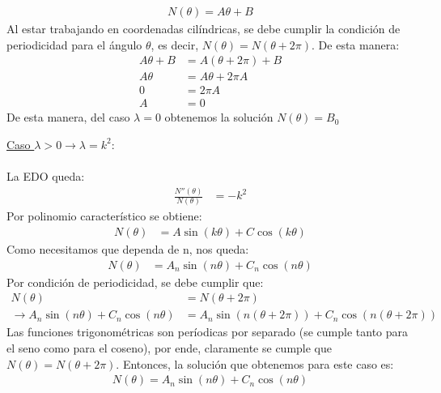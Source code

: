 \documentclass[
  11pt,
  letterpaper,
   answers
  ]{exam}
\begin{document}
\begin{questions}
\begin{solution}
\begin{parts}
    \begin{align}
        N(\theta) = A \theta + B
    \end{align}
    Al estar trabajando en coordenadas cilíndricas, se debe cumplir la condición de periodicidad para el ángulo $\theta$, es decir, $N(\theta) = N(\theta + 2 \pi)$. De esta manera:
    \begin{align}
        A \theta + B &= A(\theta + 2 \pi) + B \\
        A \theta &= A \theta + 2 \pi A \\
        0 &= 2 \pi A \\
        A &= 0
    \end{align}
    De esta manera, del caso $\lambda = 0$ obtenemos la solución $N(\theta) = B_0$

    \underline{Caso $\lambda > 0 \rightarrow \lambda = k^2$}: \\
    \\
    La EDO queda:
    \begin{align}
        \frac{N''(\theta)}{N(\theta)} &= - k^2
    \end{align}
    Por polinomio característico se obtiene:
    \begin{align}
        N(\theta) &= A \sin(k \theta) + C \cos{(k \theta)}
    \end{align}
    Como necesitamos que dependa de n, nos queda:
    \begin{align}
        N(\theta) &= A_n \sin(n \theta) + C_n \cos{(n \theta)}
    \end{align}
    Por condición de periodicidad, se debe cumplir que:
    \begin{align}
        N(\theta) &= N(\theta + 2 \pi) \\
        \rightarrow A_n \sin(n \theta) + C_n \cos{(n \theta)} &= A_n \sin(n (\theta + 2 \pi) ) + C_n \cos{(n (\theta + 2 \pi))} 
    \end{align}
    Las funciones trigonométricas son períodicas por separado (se cumple tanto para el seno como para el coseno), por ende, claramente se cumple que $N(\theta) = N(\theta + 2 \pi)$. Entonces, la solución que obtenemos  para este caso es:
    \begin{align}
        N(\theta) = A_n \sin(n \theta) + C_n \cos{(n \theta)}
    \end{align}
    

\end{parts}
\end{solution}
\end{questions}
\end{document}
